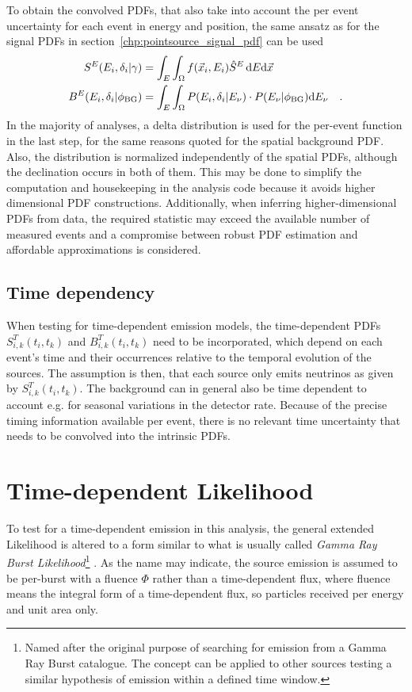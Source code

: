 To obtain the convolved PDFs, that also take into account the per event uncertainty for each event in energy and position, the same ansatz as for the signal PDFs in section~\ref{chp:pointsource_signal_pdf} can be used
\begin{align}
  S^E(E_i, \delta_i|\gamma) &=
    \int_E\int_\Omega f(\vec{x}_i, E_i)\hat{S}^E\,\mathrm{d}E\mathrm{d}\vec{x} \\
  B^E(E_i, \delta_i|\phi_\mathrm{BG}) &=
    \int_E\int_\Omega P(E_i,\delta_i|E_\nu)\cdot P(E_\nu|\phi_\mathrm{BG})
      \mathrm{d}E_\nu
    \quad\text{.}
\end{align}
In the majority of analyses, a delta distribution is used for the per-event function in the last step, for the same reasons quoted for the spatial background PDF.
Also, the distribution is normalized independently of the spatial PDFs, although the declination occurs in both of them.
This may be done to simplify the computation and housekeeping in the analysis code because it avoids higher dimensional PDF constructions.
Additionally, when inferring higher-dimensional PDFs from data, the required statistic may exceed the available number of measured events and a compromise between robust PDF estimation and affordable approximations is considered.

\subsection{Time dependency}
When testing for time-dependent emission models, the time-dependent PDFs $S_{i,k}^T(t_i, t_k)$ and $B_{i,k}^T(t_i, t_k)$ need to be incorporated, which depend on each event's time and their occurrences relative to the temporal evolution of the sources.
The assumption is then, that each source only emits neutrinos as given by $S_{i,k}^T(t_i, t_k)$.
The background can in general also be time dependent to account e.g. for seasonal variations in the detector rate.
Because of the precise timing information available per event, there is no relevant time uncertainty that needs to be convolved into the intrinsic PDFs.


\section{Time-dependent Likelihood}
  \label{chp:pointsource_tdep_llh}
To test for a time-dependent emission in this analysis, the general extended Likelihood is altered to a form similar to what is usually called \emph{Gamma Ray Burst Likelihood}\footnote{Named after the original purpose of searching for emission from a Gamma Ray Burst catalogue. The concept can be applied to other sources testing a similar hypothesis of emission within a defined time window.} \cite{Aartsen:2017zvw,Aartsen:2014aqy,Aartsen:2017wea}.
As the name may indicate, the source emission is assumed to be per-burst with a fluence $\Phi$ rather than a time-dependent flux, where fluence means the integral form of a time-dependent flux, so particles received per energy and unit area only.

